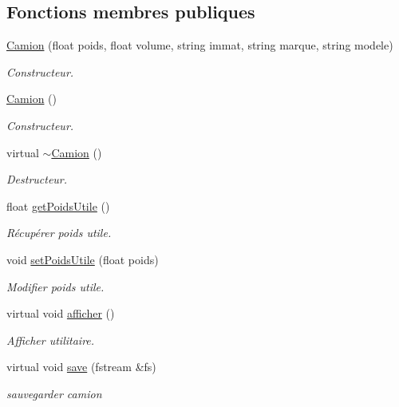 \subsection*{Fonctions membres publiques}
\begin{DoxyCompactItemize}
\item 
\hyperlink{class_camion_ac33dc959ae263b822638aa73b9438ab1}{Camion} (float poids, float volume, string immat, string marque, string modele)
\begin{DoxyCompactList}\small\item\em Constructeur. \item\end{DoxyCompactList}\item 
\hyperlink{class_camion_a5eb698c16331e4fab2ba2cbfebbea8a4}{Camion} ()
\begin{DoxyCompactList}\small\item\em Constructeur. \item\end{DoxyCompactList}\item 
virtual \hyperlink{class_camion_abd045aad98d33e8e353dcf1a6a7832c7}{$\sim$Camion} ()
\begin{DoxyCompactList}\small\item\em Destructeur. \item\end{DoxyCompactList}\item 
float \hyperlink{class_camion_a5eb44123d320dec356d4d335a60b7f28}{getPoidsUtile} ()
\begin{DoxyCompactList}\small\item\em Récupérer poids utile. \item\end{DoxyCompactList}\item 
void \hyperlink{class_camion_a3fe83aa0652ec440e915d983ac46f7d7}{setPoidsUtile} (float poids)
\begin{DoxyCompactList}\small\item\em Modifier poids utile. \item\end{DoxyCompactList}\item 
virtual void \hyperlink{class_camion_a1b7d9e844a03b1a1e7143a7618911157}{afficher} ()
\begin{DoxyCompactList}\small\item\em Afficher utilitaire. \item\end{DoxyCompactList}\item 
virtual void \hyperlink{class_camion_a2c715c85952a7e0bb2948494d79157b8}{save} (fstream \&fs)
\begin{DoxyCompactList}\small\item\em sauvegarder camion \item\end{DoxyCompactList}\end{DoxyCompactItemize}


